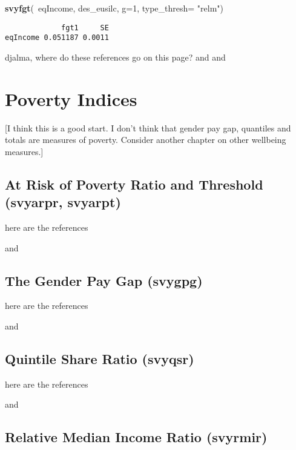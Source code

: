 \documentclass[]{book}
\newenvironment{Shaded}{\begin{snugshade}}{\end{snugshade}}
\newcommand{\KeywordTok}[1]{\textcolor[rgb]{0.13,0.29,0.53}{\textbf{{#1}}}}
\newcommand{\DataTypeTok}[1]{\textcolor[rgb]{0.13,0.29,0.53}{{#1}}}
\newcommand{\DecValTok}[1]{\textcolor[rgb]{0.00,0.00,0.81}{{#1}}}
\newcommand{\StringTok}[1]{\textcolor[rgb]{0.31,0.60,0.02}{{#1}}}
\newcommand{\NormalTok}[1]{{#1}}
\begin{document}
\begin{Shaded}
\begin{Highlighting}[]
\KeywordTok{svyfgt}\NormalTok{(~eqIncome, des_eusilc, }\DataTypeTok{g=}\DecValTok{1}\NormalTok{, }\DataTypeTok{type_thresh=} \StringTok{"relm"}\NormalTok{)}
\end{Highlighting}
\end{Shaded}

\begin{verbatim}
             fgt1     SE
eqIncome 0.051187 0.0011
\end{verbatim}

djalma, where do these references go on this page? \citep{berger2003}
and \citep{osier2009} and \citep{deville1999}

\chapter{Poverty Indices}\label{poverty}

{[}I think this is a good start. I don't think that gender pay gap,
quantiles and totals are measures of poverty. Consider another chapter
on other wellbeing measures.{]}

\section{At Risk of Poverty Ratio and Threshold (svyarpr,
svyarpt)}\label{at-risk-of-poverty-ratio-and-threshold-svyarpr-svyarpt}

here are the references

\citep{osier2009} and \citep{deville1999}

\section{The Gender Pay Gap (svygpg)}\label{the-gender-pay-gap-svygpg}

here are the references

\citep{osier2009} and \citep{deville1999}

\section{Quintile Share Ratio
(svyqsr)}\label{quintile-share-ratio-svyqsr}

here are the references

\citep{osier2009} and \citep{deville1999}

\section{Relative Median Income Ratio
(svyrmir)}\label{relative-median-income-ratio-svyrmir}
\end{document}
